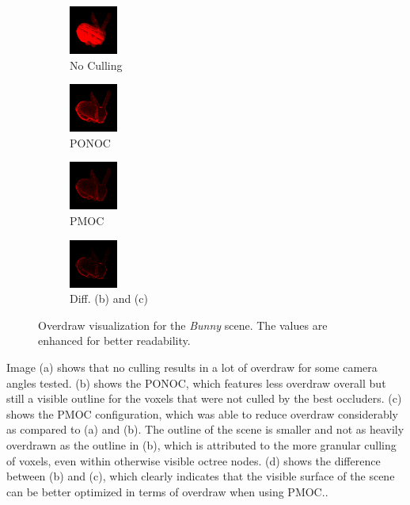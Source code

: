 \documentclass[conference]{IEEEtran}
\begin{document}
\begin{figure}
    \begin{subfigure}{60px}
        \includegraphics[width=60px]{images/overdraw-bunny2-nocull.png}
        \caption{No Culling}
        \parbox{\linewidth}{\centering\footnotesize }
    \end{subfigure}
    \begin{subfigure}{60px}
        \includegraphics[width=60px]{images/overdraw-bunny2-pooc.png}
        \caption{\ac{PONOC}}
        \parbox{\linewidth}{\centering\footnotesize }
    \end{subfigure}
    \begin{subfigure}{60px}
        \includegraphics[width=60px]{images/overdraw-bunny2-pmoc.png}
        \caption{\ac{PMOC}}
        \parbox{\linewidth}{\centering\footnotesize }
    \end{subfigure}
    \begin{subfigure}{60px}
        \includegraphics[width=60px]{images/overdraw-bunny2-diff.png}
        \caption{Diff. (b) and (c)}
        \parbox{\linewidth}{\centering\footnotesize }
    \end{subfigure}
    
    \caption{Overdraw visualization for the \emph{Bunny} scene. The values are enhanced for 
    better readability.}
    \label{fig:overdraw}
\end{figure}


\noindent
Image (a) shows that no culling results in a lot of overdraw for some camera angles tested. (b) shows 
the \ac{PONOC}, which features less overdraw overall but still a visible outline 
for the voxels that were not culled by the best occluders. (c) shows the \ac{PMOC} 
configuration, which was able to reduce overdraw considerably as compared to (a) and (b). The outline 
of the scene is smaller and not as heavily overdrawn as the outline in (b), which is attributed to the 
more granular culling of voxels, even within otherwise visible octree nodes. (d) shows the difference 
between (b) and (c), which clearly indicates that the visible surface of the scene can be better 
optimized in terms of overdraw when using \ac{PMOC}.. \\
\end{document}
